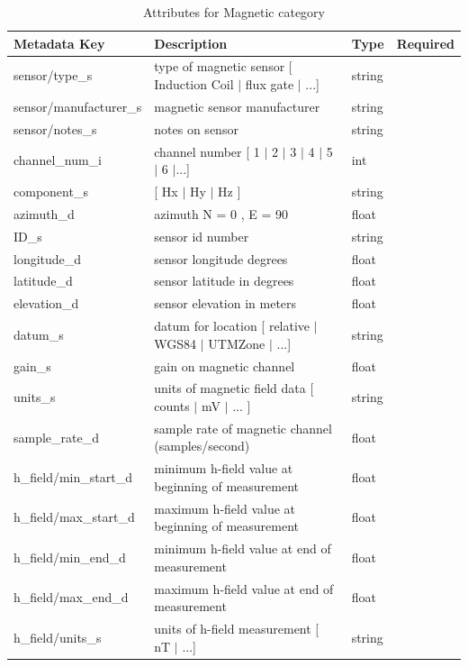 \documentclass{article}
\begin{document}
\begin{table}[htb!]
	\caption[Attributes for Magnetic Channel]{Attributes for Magnetic category}
	\begin{tabular}{|l|p{3in}|l|l|}
		\hline
		\textbf{Metadata Key} & \textbf{Description} & \textbf{Type} & \textbf{Required} \\ \hline
		sensor/type\_s & type of magnetic sensor [ Induction Coil $|$ flux gate $|$ ...] & string & \\ \hline
		sensor/manufacturer\_s & magnetic sensor manufacturer & string &  \\ \hline
		sensor/notes\_s & notes on sensor & string &  \\ \hline
		channel\_num\_i & channel number [ 1 $|$ 2 $|$ 3 $|$ 4 $|$ 5 $|$ 6 $|$...] & int &  \\ \hline
		component\_s & [ Hx $|$ Hy $|$ Hz ] & string  &  \\ \hline
		azimuth\_d & azimuth N = 0 ,  E = 90 & float &  \\ \hline
		ID\_s & sensor id number & string &  \\ \hline
		longitude\_d & sensor longitude degrees & float &  \\ \hline
		latitude\_d & sensor latitude in degrees & float &  \\ \hline
		elevation\_d & sensor elevation in meters & float &  \\ \hline
		datum\_s & datum for location [ relative $|$ WGS84 $|$ UTMZone $|$ ...] & string &  \\ \hline
		gain\_s & gain on magnetic channel & float &  \\ \hline
		units\_s & units of magnetic field data [ counts $|$ mV $|$ ... ] & string &  \\ \hline
		sample\_rate\_d & sample rate of magnetic channel (samples/second) & float &  \\ \hline
		h\_field/min\_start\_d & minimum h-field value at beginning of measurement & float &  \\ \hline
		h\_field/max\_start\_d & maximum h-field value at beginning of measurement & float &  \\ \hline
		h\_field/min\_end\_d & minimum h-field value at end of measurement & float &  \\ \hline
		h\_field/max\_end\_d & maximum h-field value at end of measurement & float &  \\ \hline
		h\_field/units\_s & units of h-field measurement [ nT $|$ ...] & string &  \\ \hline

\end{tabular}
\end{table}
\end{document}
